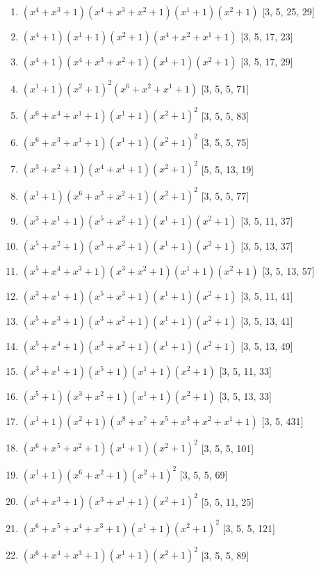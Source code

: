 \documentclass[10pt,twocolumn]{article}
\begin{document}
\begin{enumerate}
\item $(x^{4} + x^{3} + 1)(x^{4} + x^{3} + x^{2} + 1)(x^{1} + 1)(x^{2} + 1)$  [3, 5, 25, 29]
\item $(x^{4} + 1)(x^{1} + 1)(x^{2} + 1)(x^{4} + x^{2} + x^{1} + 1)$  [3, 5, 17, 23]
\item $(x^{4} + 1)(x^{4} + x^{3} + x^{2} + 1)(x^{1} + 1)(x^{2} + 1)$  [3, 5, 17, 29]
\item $(x^{1} + 1)(x^{2} + 1)^{2}(x^{6} + x^{2} + x^{1} + 1)$  [3, 5, 5, 71]
\item $(x^{6} + x^{4} + x^{1} + 1)(x^{1} + 1)(x^{2} + 1)^{2}$  [3, 5, 5, 83]
\item $(x^{6} + x^{3} + x^{1} + 1)(x^{1} + 1)(x^{2} + 1)^{2}$  [3, 5, 5, 75]
\item $(x^{3} + x^{2} + 1)(x^{4} + x^{1} + 1)(x^{2} + 1)^{2}$  [5, 5, 13, 19]
\item $(x^{1} + 1)(x^{6} + x^{3} + x^{2} + 1)(x^{2} + 1)^{2}$  [3, 5, 5, 77]
\item $(x^{3} + x^{1} + 1)(x^{5} + x^{2} + 1)(x^{1} + 1)(x^{2} + 1)$  [3, 5, 11, 37]
\item $(x^{5} + x^{2} + 1)(x^{3} + x^{2} + 1)(x^{1} + 1)(x^{2} + 1)$  [3, 5, 13, 37]
\item $(x^{5} + x^{4} + x^{3} + 1)(x^{3} + x^{2} + 1)(x^{1} + 1)(x^{2} + 1)$  [3, 5, 13, 57]
\item $(x^{3} + x^{1} + 1)(x^{5} + x^{3} + 1)(x^{1} + 1)(x^{2} + 1)$  [3, 5, 11, 41]
\item $(x^{5} + x^{3} + 1)(x^{3} + x^{2} + 1)(x^{1} + 1)(x^{2} + 1)$  [3, 5, 13, 41]
\item $(x^{5} + x^{4} + 1)(x^{3} + x^{2} + 1)(x^{1} + 1)(x^{2} + 1)$  [3, 5, 13, 49]
\item $(x^{3} + x^{1} + 1)(x^{5} + 1)(x^{1} + 1)(x^{2} + 1)$  [3, 5, 11, 33]
\item $(x^{5} + 1)(x^{3} + x^{2} + 1)(x^{1} + 1)(x^{2} + 1)$  [3, 5, 13, 33]
\item $(x^{1} + 1)(x^{2} + 1)(x^{8} + x^{7} + x^{5} + x^{3} + x^{2} + x^{1} + 1)$  [3, 5, 431]
\item $(x^{6} + x^{5} + x^{2} + 1)(x^{1} + 1)(x^{2} + 1)^{2}$  [3, 5, 5, 101]
\item $(x^{1} + 1)(x^{6} + x^{2} + 1)(x^{2} + 1)^{2}$  [3, 5, 5, 69]
\item $(x^{4} + x^{3} + 1)(x^{3} + x^{1} + 1)(x^{2} + 1)^{2}$  [5, 5, 11, 25]
\item $(x^{6} + x^{5} + x^{4} + x^{3} + 1)(x^{1} + 1)(x^{2} + 1)^{2}$  [3, 5, 5, 121]
\item $(x^{6} + x^{4} + x^{3} + 1)(x^{1} + 1)(x^{2} + 1)^{2}$  [3, 5, 5, 89]

\end{enumerate}
\end{document}
